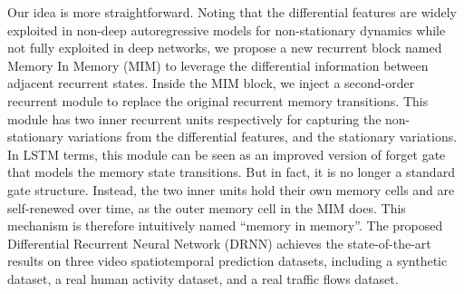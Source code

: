 \documentclass[10pt,twocolumn,letterpaper]{article}
\begin{document}
Our idea is more straightforward. Noting that the differential features are widely exploited in non-deep autoregressive models for non-stationary dynamics \citep{percival1993spectral} while not fully exploited in deep networks, we propose a new recurrent block named Memory In Memory (MIM) to leverage the differential information between adjacent recurrent states. Inside the MIM block, we inject a second-order recurrent module to replace the original recurrent memory transitions. 
This module has two inner recurrent units respectively for capturing the non-stationary variations from the differential features, and the stationary variations. In LSTM terms, this module can be seen as an improved version of forget gate that models the memory state transitions. But in fact, it is no longer a standard gate structure. Instead, the two inner units hold their own memory cells and are self-renewed over time, as the outer memory cell in the MIM does. This mechanism is therefore intuitively named ``memory in memory''. The proposed Differential Recurrent Neural Network (DRNN) achieves the state-of-the-art results on three video spatiotemporal prediction datasets, including a synthetic dataset, a real human activity dataset, and a real traffic flows dataset.
\end{document}
